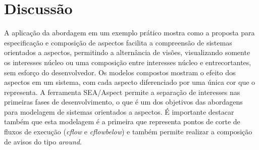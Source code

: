 \section{Discussão}

A aplicação da abordagem em um exemplo prático mostra como a proposta para especificação e composição de aspectos facilita a compreensão de
sistemas orientados a aspectos, permitindo a alternância de visões, visualizando somente os interesses núcleo ou uma composição entre interesses núcleo e entrecortantes, 
sem esforço do desenvolvedor. Os modelos compostos mostram o efeito dos aspectos em um sistema, com cada aspecto diferenciado por uma única cor que o
representa. A ferramenta SEA/Aspect permite a separação de interesses nas primeiras fases de desenvolvimento, o que é um dos objetivos das abordagens para modelagem
de sistemas orientados a aspectos. É importante destacar também que esta modelagem é a primeira que representa pontos de corte de fluxos de execução
(\textit{cflow} e \textit{cflowbelow}) e também permite realizar a composição de avisos do tipo \textit{around}.
